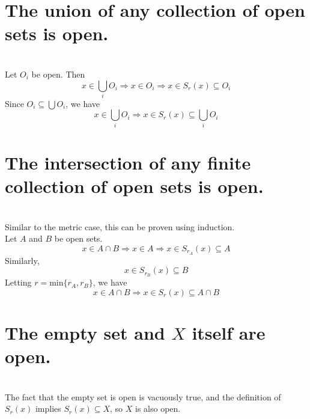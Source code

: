 \begin{parts}
 
 \part{The union of any collection of open sets is open.}
 
 
\begin{solution}
 \\Let $O_i$ be open. Then
 $$x \in \bigcup_i O_i \Rightarrow x \in O_i \Rightarrow x \in S_r(x) \subseteq O_i$$
 Since $O_i \subseteq \bigcup O_i$, we have
 $$x \in \bigcup_i O_i \Rightarrow x \in S_r(x) \subseteq \bigcup_i O_i$$
\end{solution}

\part{The intersection of any finite collection of open sets is open.}

\begin{solution}
 \\Similar to the metric case, this can be proven using induction. \\
Let $A$ and $B$ be open sets.
$$x \in A \cap B \Rightarrow x \in A \Rightarrow x \in S_{r_A}(x) \subseteq A$$
Similarly,
$$x \in S_{r_B}(x) \subseteq B$$
Letting $r = \text{min}\{r_A,r_B\}$, we have
$$x \in A \cap B \Rightarrow x \in S_r(x) \subseteq A \cap B$$
\end{solution}

\part{The empty set and $X$ itself are open.}

\begin{solution}
 \\The fact that the empty set is open is vacuously true, and the definition of $S_r(x)$ implies $S_r(x) \subseteq X$, so $X$ is also open.
\end{solution}
\end{parts}


